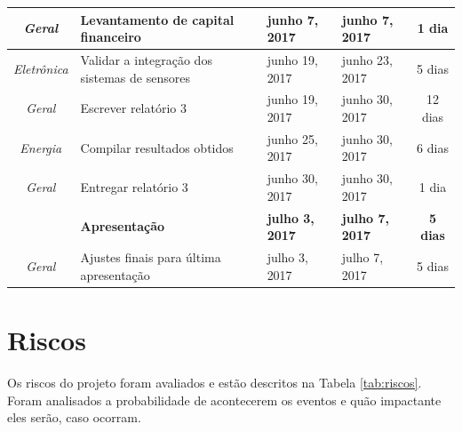 \begin{longtable}{|c|m{6.5cm}|m{3.2cm}|m{3.2cm}|c|}
\textit{Geral}                                                            & Levantamento de capital financeiro                   & junho 7, 2017                        & junho 7, 2017                     & 1 dia                                 \\ \hline
\textit{Eletrônica}                                                       & Validar a integração dos sistemas de sensores        & junho 19, 2017                       & junho 23, 2017                    & 5 dias                                \\ \hline
\textit{Geral}                                                            & Escrever relatório 3                                 & junho 19, 2017                       & junho 30, 2017                    & 12 dias                               \\ \hline
\textit{Energia}                                                          & Compilar resultados obtidos                          & junho 25, 2017                       & junho 30, 2017                    & 6 dias                                \\ \hline
\textit{Geral}                                                            & Entregar relatório 3                                 & junho 30, 2017                       & junho 30, 2017                    & 1 dia                                 \\ \hline
\textit{\textbf{}}                                                        & \textbf{Apresentação}                                & \textbf{julho 3, 2017}               & \textbf{julho 7, 2017}            & \textbf{5 dias}                       \\ \hline
\textit{Geral}                                                            & Ajustes finais para última apresentação              & julho 3, 2017                        & julho 7, 2017                     & 5 dias                                \\ \hline
\end{longtable}

\section{Riscos}

Os riscos do projeto foram avaliados e estão descritos na Tabela \ref{tab:riscos}. Foram analisados a probabilidade de acontecerem os eventos e quão impactante eles serão, caso ocorram.

